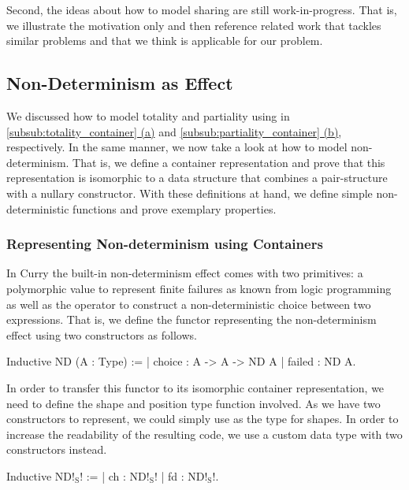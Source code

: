 Second, the ideas about how to model sharing are still work\--in\--progress.
That is, we illustrate the motivation only and then reference related work that tackles similar problems and that we think is applicable for our problem.

\subsection{Non\--Determinism as Effect}

We discussed how to model totality and partiality using  in \hyperref[subsub:totality_container]{\autoref{subsub:totality_container} (a)} and \hyperref[subsub:partiality_container]{\autoref{subsub:partiality_container} (b)}, respectively.
In the same manner, we now take a look at how to model non\--determinism.
That is, we define a container representation and prove that this representation is isomorphic to a data structure that combines a pair\--structure with a nullary constructor.
With these definitions at hand, we define simple non\--deterministic functions and prove exemplary properties.

\subsubsection{Representing Non\--determinism using Containers}
\label{subsubsec:nondetContainter}

In Curry the built\--in non\--determinism effect comes with two primitives: a polymorphic value  to represent finite failures as known from logic programming as well as the operator  to construct a non\--deterministic choice between two expressions.
That is, we define the functor representing the non\--determinism effect using two constructors as follows. 

\begin{coqcode}
Inductive ND (A : Type) :=
| choice : A -> A -> ND A
| failed : ND A.
\end{coqcode}

In order to transfer this functor to its isomorphic container representation, we need to define the shape and position type function involved.
As we have two constructors to represent, we could simply use  as the type for shapes.
In order to increase the readability of the resulting code, we use a custom data type with two constructors instead.

\begin{coqcode}
Inductive ND!$_\text{S}$! :=
| ch : ND!$_\text{S}$!
| fd : ND!$_\text{S}$!.
\end{coqcode}

